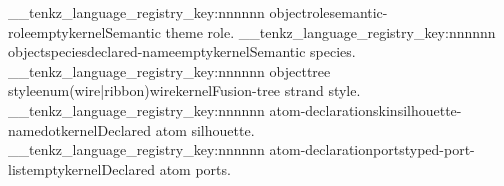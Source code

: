 \__tenkz_language_registry_key:nnnnnn {object}{role}{semantic-role}{empty}{kernel}{Semantic theme role.}
\__tenkz_language_registry_key:nnnnnn {object}{species}{declared-name}{empty}{kernel}{Semantic species.}
\__tenkz_language_registry_key:nnnnnn {object}{tree style}{enum(wire|ribbon)}{wire}{kernel}{Fusion-tree strand style.}
\__tenkz_language_registry_key:nnnnnn {atom-declaration}{skin}{silhouette-name}{dot}{kernel}{Declared atom silhouette.}
\__tenkz_language_registry_key:nnnnnn {atom-declaration}{ports}{typed-port-list}{empty}{kernel}{Declared atom ports.}


%
%
%
